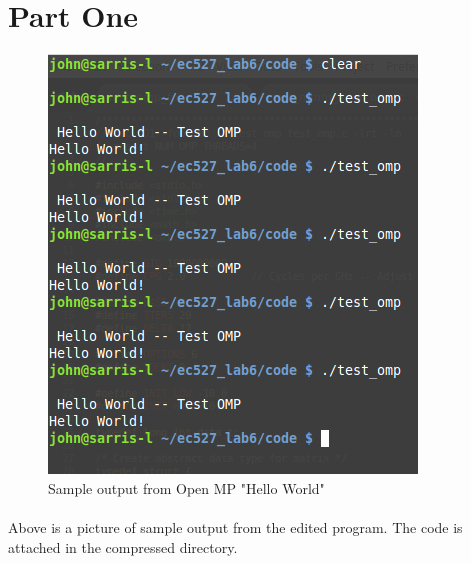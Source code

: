 \documentclass[12pt,8.5in,11in]{article}
\begin{document}
	\maketitle
	
\section{Part One}

\begin{figure}[t]
  \centering
  \includegraphics[width=\linewidth]{part_1.png}
  \caption{Sample output from Open MP "Hello World"}
  \label{fig:Hello World Open MP}
\end{figure}

\paragraph{}
Above is a picture of sample output from the edited program.  The code is attached in the compressed directory.
	
\end{document}
